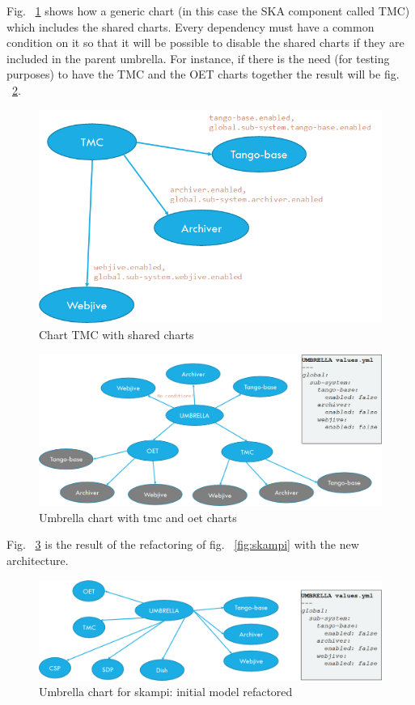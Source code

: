 \documentclass[a4paper]{spie}  %
\begin{document}
Fig. ~\ref{fig:tmc_shared_charts} shows how a generic chart (in this case the SKA component called TMC) which includes the shared charts. Every dependency must have a common condition on it so that it will be possible to disable the shared charts if they are included in the parent umbrella. For instance, if there is the need (for testing purposes) to have the TMC and the OET charts together the result will be fig. ~\ref{fig:tmc_oet_umbrella}.

\begin{figure}[!htb]
   \centering
   \includegraphics*[width=0.5\columnwidth]{tmc_shared_charts}
   \caption{Chart TMC with shared charts}
   \label{fig:tmc_shared_charts}
\end{figure}

\begin{figure}[!htb]
   \centering
   \includegraphics*[width=0.8\columnwidth]{tmc_oet_umbrella}
   \caption{Umbrella chart with tmc and oet charts}
   \label{fig:tmc_oet_umbrella}
\end{figure}

Fig. ~\ref{fig:umbrella_skampi} is the result of the refactoring of fig. ~\ref{fig:skampi} with the new architecture.

\begin{figure}[!htb]
   \centering
   \includegraphics*[width=1\columnwidth]{umbrella_skampi}
   \caption{Umbrella chart for skampi: initial model refactored}
   \label{fig:umbrella_skampi}
\end{figure}
\end{document}
